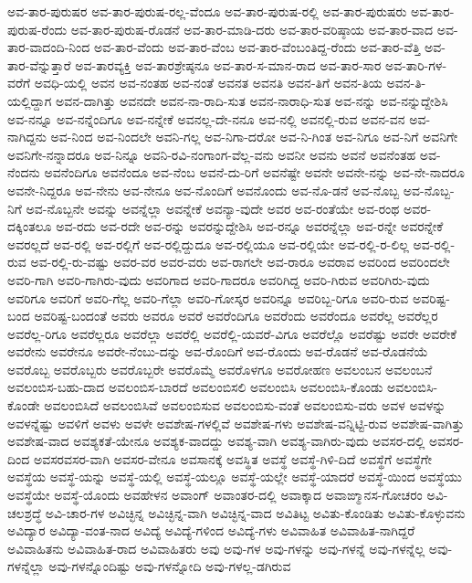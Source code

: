 {ಅವ-ತಾರ-ಪುರುಷರ
ಅವ-ತಾರ-ಪುರುಷ-ರಲ್ಲ-ವೆಂದೂ
ಅವ-ತಾರ-ಪುರುಷ-ರಲ್ಲಿ
ಅವ-ತಾರ-ಪುರುಷರು
ಅವ-ತಾರ-ಪುರುಷ-ರೆಂದು
ಅವ-ತಾರ-ಪುರುಷ-ರೊಡನೆ
ಅವ-ತಾರ-ಮಾಡಿ-ದರು
ಅವ-ತಾರ-ವರಿಷ್ಠಾಯ
ಅವ-ತಾರ-ವಾದ
ಅವ-ತಾರ-ವಾದಂದಿ-ನಿಂದ
ಅವ-ತಾರ-ವೆಂದು
ಅವ-ತಾರ-ವೆಂಬ
ಅವ-ತಾರ-ವೆಂಬಂತಿದ್ದ-ರೆಂದು
ಅವ-ತಾರ-ವೆತ್ತಿ
ಅವ-ತಾರ-ವೆನ್ನುತ್ತಾರೆ
ಅವ-ತಾರವ್ಯಕ್ತಿ
ಅವ-ತಾರಶ್ರೇಷ್ಠನೂ
ಅವ-ತಾರ-ಸ-ಮಾನ-ರಾದ
ಅವ-ತಾರ-ಸಾರ
ಅವ-ತಾರಿ-ಗಳ-ವರೆಗೆ
ಅವಧಿ-ಯಲ್ಲಿ
ಅವನ
ಅವ-ನಂತಹ
ಅವ-ನಂತೆ
ಅವನತ
ಅವನತಿ
ಅವನ-ತಿಗೆ
ಅವನ-ತಿಯ
ಅವನ-ತಿ-ಯಲ್ಲಿದ್ದಾಗ
ಅವನ-ದಾಗಿತ್ತು
ಅವನದೇ
ಅವನ-ನಾ-ರಾದಿ-ಸುತ
ಅವನ-ನಾರಾಧಿ-ಸುತ
ಅವ-ನನ್ನು
ಅವ-ನನ್ನುದ್ದೇಶಿಸಿ
ಅವ-ನನ್ನೂ
ಅವ-ನನ್ನೆಂದಿಗೂ
ಅವ-ನನ್ನೇಕೆ
ಅವನಲ್ಲ-ದೇ-ನನೂ
ಅವ-ನಲ್ಲಿ
ಅವನಲ್ಲಿ-ರುವ
ಅವನ-ವನ
ಅವ-ನಾಗಿದ್ದನು
ಅವ-ನಿಂದ
ಅವ-ನಿಂದಲೇ
ಅವನಿ-ಗಲ್ಲ
ಅವ-ನಿಗಾ-ದರೋ
ಅವ-ನಿ-ಗಿಂತ
ಅವ-ನಿಗೂ
ಅವ-ನಿಗೆ
ಅವನಿಗೇ
ಅವನಿಗೇ-ನನ್ನಾದರೂ
ಅವ-ನಿನ್ನೂ
ಅವನಿ-ರವಿ-ನಂಗಾಂಗ-ವೆಲ್ಲ-ವನು
ಅವನೀ
ಅವನು
ಅವನೆ
ಅವನೆಂತಹ
ಅವ-ನೆಂದನು
ಅವನೆಂದಿಗೂ
ಅವನೆಂದೂ
ಅವ-ನೆಂಬ
ಅವನೆ-ದು-ರಿಗೆ
ಅವನೆಷ್ಟೇ
ಅವನೇ
ಅವನೇ-ನನ್ನು
ಅವ-ನೇ-ನಾದರೂ
ಅವನೇ-ನಿದ್ದರೂ
ಅವ-ನೇನು
ಅವ-ನೇನೂ
ಅವ-ನೊಂದಿಗೆ
ಅವನೊಂದು
ಅವ-ನೊ-ಡನೆ
ಅವ-ನೊಬ್ಬ
ಅವ-ನೊಬ್ಬ-ನಿಗೆ
ಅವ-ನೊಬ್ಬನೇ
ಅವನ್ನು
ಅವನ್ನೆಲ್ಲಾ
ಅವನ್ನೇಕೆ
ಅವನ್ಯಾ-ವುದೇ
ಅವರ
ಅವ-ರಂತೆಯೇ
ಅವ-ರಂಥ
ಅವರ-ದಕ್ಕಿಂತಲೂ
ಅವ-ರದು
ಅವ-ರದೇ
ಅವ-ರನ್ನು
ಅವರನ್ನುದ್ದೇಶಿಸಿ
ಅವ-ರನ್ನೂ
ಅವರನ್ನೆಲ್ಲಾ
ಅವ-ರನ್ನೇ
ಅವರನ್ನೇಕೆ
ಅವರಲ್ಲದೆ
ಅವ-ರಲ್ಲಿ
ಅವ-ರಲ್ಲಿಗೆ
ಅವ-ರಲ್ಲಿದ್ದುದೂ
ಅವ-ರಲ್ಲಿಯೂ
ಅವ-ರಲ್ಲಿಯೇ
ಅವ-ರಲ್ಲಿ-ರ-ಲಿಲ್ಲ
ಅವ-ರಲ್ಲಿ-ರುವ
ಅವ-ರಲ್ಲಿ-ರು-ವಷ್ಟು
ಅವರ-ವರ
ಅವರ-ವರು
ಅವ-ರಾಗಲೇ
ಅವ-ರಾರೂ
ಅವರಾವ
ಅವರಿಂದ
ಅವರಿಂದಲೇ
ಅವರಿ-ಗಾಗಿ
ಅವರಿ-ಗಾಗಿರು-ವುದು
ಅವರಿಗಾದ
ಅವರಿ-ಗಾದರೂ
ಅವರಿಗಿದ್ದ
ಅವರಿ-ಗಿರುವ
ಅವರಿಗಿರು-ವುದು
ಅವರಿಗೂ
ಅವರಿಗೆ
ಅವರಿ-ಗೆಲ್ಲ
ಅವರಿ-ಗೆಲ್ಲಾ
ಅವರಿ-ಗೋಸ್ಕರ
ಅವರಿನ್ನೂ
ಅವರಿಬ್ಬ-ರಿಗೂ
ಅವರಿ-ರುವ
ಅವರಿಷ್ಟ-ಬಂದ
ಅವರಿಷ್ಟ-ಬಂದಂತೆ
ಅವರು
ಅವರೂ
ಅವರೆ
ಅವರೆಂದಿಗೂ
ಅವರೆಂದು
ಅವರೆಂದೂ
ಅವರೆಲ್ಲ
ಅವರೆಲ್ಲರ
ಅವರೆಲ್ಲ-ರಿಗೂ
ಅವರೆಲ್ಲರೂ
ಅವರೆಲ್ಲಾ
ಅವರೆಲ್ಲಿ
ಅವರೆಲ್ಲಿ-ಯವರೆ-ವಿಗೂ
ಅವರೆಲ್ಲೊ
ಅವರೆಷ್ಟು
ಅವರೇ
ಅವರೇಕೆ
ಅವರೇನು
ಅವರೇನೂ
ಅವರೇ-ನೆಂಬು-ದನ್ನು
ಅವ-ರೊಂದಿಗೆ
ಅವ-ರೊಂದು
ಅವ-ರೊಡನೆ
ಅವ-ರೊಡನೆಯೆ
ಅವರೊಬ್ಬ
ಅವರೊಬ್ಬರು
ಅವರೊಬ್ಬರೇ
ಅವರೊಮ್ಮೆ
ಅವರೊಳಗೂ
ಅವರೋಹಣ
ಅವಲಂಬನ
ಅವಲಂಬನೆ
ಅವಲಂಬಿಸ-ಬಹು-ದಾದ
ಅವಲಂಬಿಸ-ಬಾರದೆ
ಅವಲಂಬಿಸಲಿ
ಅವಲಂಬಿಸಿ
ಅವಲಂಬಿಸಿ-ಕೊಂಡು
ಅವಲಂಬಿಸಿ-ಕೊಂಡೇ
ಅವಲಂಬಿಸಿದೆ
ಅವಲಂಬಿಸಿವೆ
ಅವಲಂಬಿಸುವ
ಅವಲಂಬಿಸು-ವಂತೆ
ಅವಲಂಬಿಸು-ವರು
ಅವಳ
ಅವಳನ್ನು
ಅವಳನ್ನೆಷ್ಟು
ಅವಳಿಗೆ
ಅವಳು
ಅವಳೇ
ಅವಶೇಷ-ಗಳಲ್ಲಿವೆ
ಅವಶೇಷ-ಗಳು
ಅವಶೇಷ-ವನ್ನಿಟ್ಟಿ-ರುವ
ಅವಶೇಷ-ವಾಗಿತ್ತು
ಅವಶೇಷ-ವಾದ
ಅವಶ್ಯಕತೆ-ಯೇನೂ
ಅವಶ್ಯಕ-ವಾದದ್ದು
ಅವಶ್ಯ-ವಾಗಿ
ಅವಶ್ಯ-ವಾಗಿರು-ವುದು
ಅವಸರ-ದಲ್ಲಿ
ಅವಸರ-ದಿಂದ
ಅವಸರವಸರ-ವಾಗಿ
ಅವಸರ-ವೇನೂ
ಅವಸಾನಕ್ಕೆ
ಅವಸ್ಥಿತ
ಅವಸ್ಥೆ
ಅವಸ್ಥೆ-ಗಿಳಿ-ದಿದೆ
ಅವಸ್ಥೆಗೆ
ಅವಸ್ಥೆಗೇ
ಅವಸ್ಥೆಯ
ಅವಸ್ಥೆ-ಯನ್ನು
ಅವಸ್ಥೆ-ಯಲ್ಲಿ
ಅವಸ್ಥೆ-ಯಲ್ಲೂ
ಅವಸ್ಥೆ-ಯಲ್ಲೇ
ಅವಸ್ಥೆ-ಯಾದರೆ
ಅವಸ್ಥೆ-ಯಿಂದ
ಅವಸ್ಥೆಯು
ಅವಸ್ಥೆಯೇ
ಅವಸ್ಥೆ-ಯೊಂದು
ಅವಹೇಳನ
ಅವಾಂಗ್
ಅವಾಂತರ-ದಲ್ಲಿ
ಅವಾಕ್ಕಾದ
ಅವಾಙ್ಮಾನಸ-ಗೋಚರಂ
ಅವಿ-ಚಲಶ್ರದ್ಧೆ
ಅವಿ-ಚಾರ-ಗಳ
ಅವಿಚ್ಛಿನ್ನ
ಅವಿಚ್ಛಿನ್ನ-ವಾಗಿ
ಅವಿಚ್ಛಿನ್ನ-ವಾದ
ಅವಿತಿಟ್ಟ
ಅವಿತು-ಕೊಂಡಿತು
ಅವಿತು-ಕೊಳ್ಳುವನು
ಅವಿದ್ಯಾರ
ಅವಿದ್ಯಾ-ವಂತ-ನಾದ
ಅವಿದ್ಯೆ
ಅವಿದ್ಯೆ-ಗಳಿಂದ
ಅವಿದ್ಯೆ-ಗಳು
ಅವಿವಾಹಿತ
ಅವಿವಾಹಿತ-ನಾಗಿದ್ದರೆ
ಅವಿವಾಹಿತನು
ಅವಿವಾಹಿತ-ರಾದ
ಅವಿವಾಹಿತರು
ಅವು
ಅವು-ಗಳ
ಅವು-ಗಳನ್ನು
ಅವು-ಗಳನ್ನೆ
ಅವು-ಗಳನ್ನೆಲ್ಲ
ಅವು-ಗಳನ್ನೆಲ್ಲಾ
ಅವು-ಗಳನ್ನೊಂದಿಷ್ಟು
ಅವು-ಗಳನ್ನೋದಿ
ಅವು-ಗಳಲ್ಲ-ಡಗಿರುವ
}
